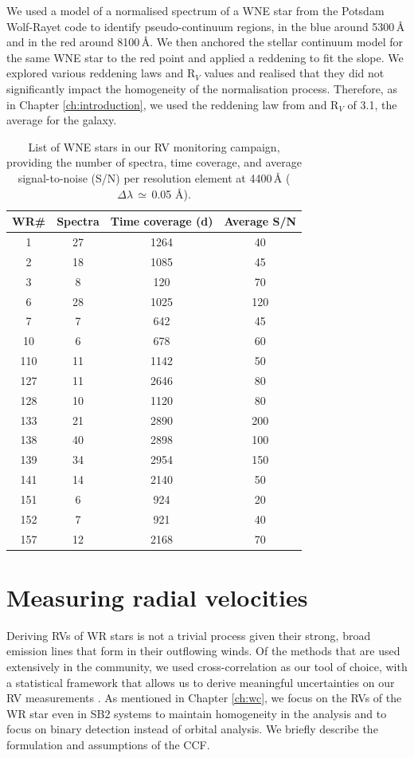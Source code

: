 We used a model of a normalised spectrum of a WNE star from the Potsdam Wolf-Rayet code \citep[PoWR:][]{grafener_line-blanketed_2002,hamann_temperature_2003,2004HamannGrafenerWN,2015TodtWNmodels} to identify pseudo-continuum regions, in the blue around 5300\,\r{A} and in the red around 8100\,\r{A}. We then anchored the stellar continuum model for the same WNE star to the red point and applied a reddening to fit the slope. We explored various reddening laws and R$_V$ values and realised that they did not significantly impact the homogeneity of the normalisation process. Therefore, as in Chapter \ref{ch:introduction}, we used the reddening law from \citet{2004Fitzpatrick} and R$_V$ of 3.1, the average for the galaxy. 

\begin{table}
\centering
\caption{List of WNE stars in our RV monitoring campaign, providing the number of spectra, time coverage, and average signal-to-noise (S/N) per resolution element at 4400\,\r{A} ($\Delta\lambda\,\simeq\,$0.05 \r{A}).}
\begin{tabular}{cccc}
\hline \hline
WR\#&Spectra&Time coverage (d)&Average S/N \\ \hline
1&27&1264&40 \\
2&18&1085&45 \\
3&8&120&70 \\
6&28&1025&120 \\
7&7&642&45 \\
10&6&678&60 \\
110&11&1142&50 \\
127&11&2646&80 \\
128&10&1120&80 \\
133&21&2890&200 \\
138&40&2898&100 \\
139&34&2954&150 \\
141&14&2140&50 \\
151&6&924&20 \\
152&7&921&40 \\
157&12&2168&70 \\ \hline

\end{tabular}
\label{tab:wr_epochs}
\end{table}

\section{Measuring radial velocities}\label{sect:RVdet_WNE}
Deriving RVs of WR stars is not a trivial process given their strong, broad emission lines that form in their outflowing winds. Of the methods that are used extensively in the community, we used cross-correlation as our tool of choice, with a statistical framework that allows us to derive meaningful uncertainties on our RV measurements \citep[][see Chapter \ref{ch:wc} for more details]{2003Zucker}. As mentioned in Chapter \ref{ch:wc}, we focus on the RVs of the WR star even in SB2 systems to maintain homogeneity in the analysis and to focus on binary detection instead of orbital analysis. We briefly describe the formulation and assumptions of the CCF. 

